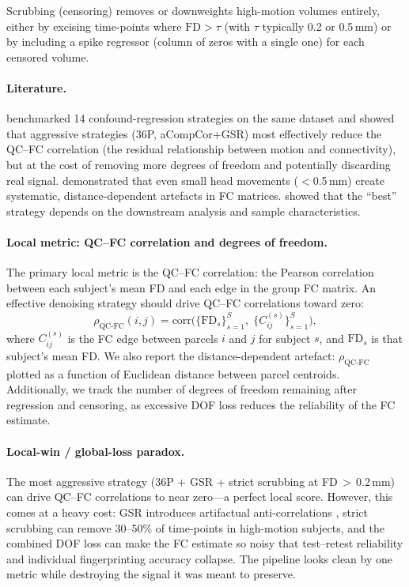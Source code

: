 \documentclass[11pt,a4paper]{article}
\begin{document}
Scrubbing (censoring) removes or downweights high-motion volumes entirely, either by excising time-points where $\mathrm{FD} > \tau$ (with $\tau$ typically 0.2 or 0.5\,mm) or by including a spike regressor (column of zeros with a single one) for each censored volume.

\paragraph{Literature.}
\citet{ciric2017} benchmarked 14 confound-regression strategies on the same dataset and showed that aggressive strategies (36P, aCompCor+GSR) most effectively reduce the QC--FC correlation (the residual relationship between motion and connectivity), but at the cost of removing more degrees of freedom and potentially discarding real signal.  \citet{power2012} demonstrated that even small head movements ($<$0.5\,mm) create systematic, distance-dependent artefacts in FC matrices.  \citet{parkes2018} showed that the ``best'' strategy depends on the downstream analysis and sample characteristics.

\paragraph{Local metric: QC--FC correlation and degrees of freedom.}
The primary local metric is the QC--FC correlation: the Pearson correlation between each subject's mean FD and each edge in the group FC matrix.  An effective denoising strategy should drive QC--FC correlations toward zero:
\begin{equation}
    \rho_{\mathrm{QC\text{-}FC}}(i,j) = \mathrm{corr}\!\bigl(\{\mathrm{FD}_s\}_{s=1}^{S},\; \{C_{ij}^{(s)}\}_{s=1}^{S}\bigr),
\end{equation}
where $C_{ij}^{(s)}$ is the FC edge between parcels $i$ and $j$ for subject $s$, and $\mathrm{FD}_s$ is that subject's mean FD.  We also report the distance-dependent artefact: $\rho_{\mathrm{QC\text{-}FC}}$ plotted as a function of Euclidean distance between parcel centroids.  Additionally, we track the number of degrees of freedom remaining after regression and censoring, as excessive DOF loss reduces the reliability of the FC estimate.

\paragraph{Local-win / global-loss paradox.}
The most aggressive strategy (36P + GSR + strict scrubbing at FD\,$>$\,0.2\,mm) can drive QC--FC correlations to near zero---a perfect local score.  However, this comes at a heavy cost: GSR introduces artifactual anti-correlations \citep{murphy2009}, strict scrubbing can remove 30--50\% of time-points in high-motion subjects, and the combined DOF loss can make the FC estimate so noisy that test--retest reliability and individual fingerprinting accuracy collapse.  The pipeline looks clean by one metric while destroying the signal it was meant to preserve.
\end{document}
